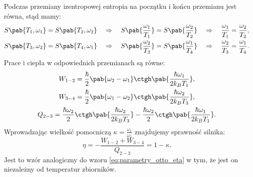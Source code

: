 Podczas przemiany izentropowej entropia na początku i końcu przemianu jest równa, stąd mamy:
\begin{equation}\label{eq:endo_otto_omegaT}
\begin{split}
	S\pab{T_1,\omega_1} = S\pab{T_2,\omega_2} \quad\Rightarrow\quad
	S\pab{\frac{\omega_1}{T_1}} = S\pab{\frac{\omega_2}{T_2}} \quad\Rightarrow\quad
	\frac{\omega_1}{T_1} = \frac{\omega_2}{T_2}, \\
	S\pab{T_3,\omega_2} = S\pab{T_4,\omega_1} \quad\Rightarrow\quad
	S\pab{\frac{\omega_2}{T_3}} = S\pab{\frac{\omega_1}{T_4}} \quad\Rightarrow\quad
	\frac{\omega_2}{T_3} = \frac{\omega_1}{T_4}.
\end{split}
\end{equation}
Prace i ciepła w odpowiednich przemianach są równe:
\begin{gather*}
	W_{1-2} = \frac{\hbar}{2}\pab{\omega_2 - \omega_1} \ctgh\pab{\frac{\hbar\omega_1}{2k_B T_1}}, \\
	W_{3-4} = \frac{\hbar}{2}\pab{\omega_1 - \omega_2} \ctgh\pab{\frac{\hbar\omega_2}{2k_B T_3}}, \\
	Q_{2-3} = \frac{\hbar\omega_2}{2} \ctgh\pab{\frac{\hbar\omega_2}{2k_B T_3}} - \frac{\hbar\omega_2}{2} \ctgh\pab{\frac{\hbar\omega_1}{2k_B T_1}}.
\end{gather*}
Wprowadzając wielkość pomocniczą \(\kappa = \frac{\omega_1}{\omega_2}\) znajdujemy sprawność silnika:
\begin{equation}\label{eq:sprawnosc_kwantowy_otto}
	\eta = - \frac{W_{1-2} + W_{3-4}}{Q_{2-3}} = 1 - \kappa.
\end{equation}
Jest to wzór analogiczny do wzoru \eqref{eq:parametry_otto_eta} w tym, że jest on niezależny od temperatur zbiorników.

